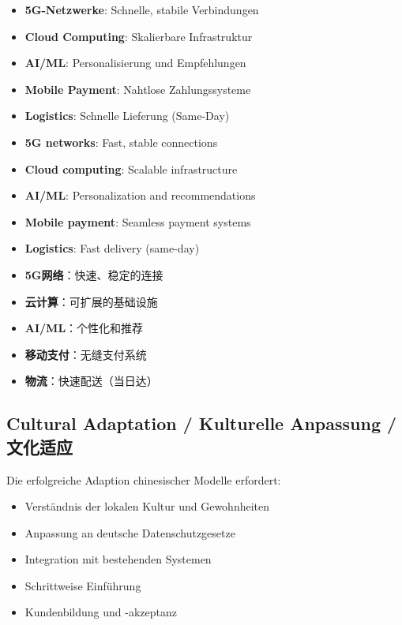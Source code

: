 \begin{otherlanguage}{ngerman}
\begin{itemize}
    \item \textbf{5G-Netzwerke}: Schnelle, stabile Verbindungen
    \item \textbf{Cloud Computing}: Skalierbare Infrastruktur
    \item \textbf{AI/ML}: Personalisierung und Empfehlungen
    \item \textbf{Mobile Payment}: Nahtlose Zahlungssysteme
    \item \textbf{Logistics}: Schnelle Lieferung (Same-Day)
\end{itemize}
\end{otherlanguage}

\begin{itemize}
    \item \textbf{5G networks}: Fast, stable connections
    \item \textbf{Cloud computing}: Scalable infrastructure
    \item \textbf{AI/ML}: Personalization and recommendations
    \item \textbf{Mobile payment}: Seamless payment systems
    \item \textbf{Logistics}: Fast delivery (same-day)
\end{itemize}

\begin{itemize}
    \item \textbf{5G网络}：快速、稳定的连接
    \item \textbf{云计算}：可扩展的基础设施
    \item \textbf{AI/ML}：个性化和推荐
    \item \textbf{移动支付}：无缝支付系统
    \item \textbf{物流}：快速配送（当日达）
\end{itemize}

\subsection{Cultural Adaptation / Kulturelle Anpassung / 文化适应}

\begin{otherlanguage}{ngerman}
Die erfolgreiche Adaption chinesischer Modelle erfordert:
\begin{itemize}
    \item Verständnis der lokalen Kultur und Gewohnheiten
    \item Anpassung an deutsche Datenschutzgesetze
    \item Integration mit bestehenden Systemen
    \item Schrittweise Einführung
    \item Kundenbildung und -akzeptanz
\end{itemize}
\end{otherlanguage}

